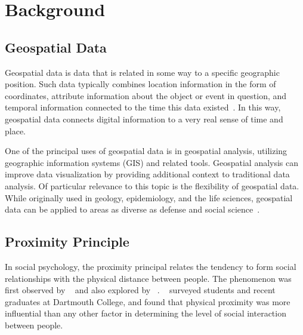 \section{Background}

\subsection{Geospatial Data}

Geospatial data is data that is related in some way to a specific geographic position. Such data typically combines location information in the form of coordinates, attribute information about the object or event in question, and temporal information connected to the time this data existed~\cite{ibm}. In this way, geospatial data connects digital information to a very real sense of time and place.

One of the principal uses of geospatial data is in geospatial analysis, utilizing geographic information systems (\textsc{GIS}) and related tools. Geospatial analysis can improve data visualization by providing additional context to traditional data analysis. Of particular relevance to this topic is the flexibility of geospatial data. While originally used in geology, epidemiology, and the life sciences, geospatial data can be applied to areas as diverse as defense and social science~\cite{ibm}.

\subsection{Proximity Principle}

In social psychology, the proximity principal relates the tendency to form social relationships with the physical distance between people. The phenomenon was first observed by \citeauthor{newcomb_1960}~\cite{newcomb_1960} and also explored by \citeauthor{festinger_1950}~\cite{festinger_1950}. \citeauthor{marmaros_2006}~\cite{marmaros_2006} surveyed students and recent graduates at Dartmouth College, and found that physical proximity was more influential than any other factor in determining the level of social interaction between people.
